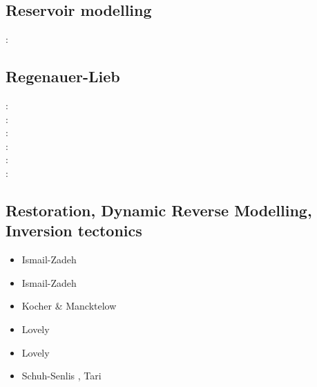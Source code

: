 \begin{scriptsize}
\cite{benz02}
\cite{bewa08}
\cite{urvs08}
\end{scriptsize}

\subsection{Reservoir modelling}

\begin{scriptsize}
\twothousandthirteen: \cite{orwa13}
\end{scriptsize}

\subsection{Regenauer-Lieb}

{\scriptsize
\twothousand: \cite{reyu00}\\
\twothousandthree: \cite{reyu03}\\
\twothousandfour: \cite{reyu04}\\
\twothousandsix: \cite{rehy06}\cite{rewr06}\\
\twothousandnine: \cite{reps09}\\
\twothousandthirteen: \cite{revp13}
}

\subsection{Restoration, Dynamic Reverse Modelling, Inversion tectonics}

\begin{scriptsize}
\begin{itemize}
\item[\twothousandone] Ismail-Zadeh \etal \cite{istv01}
\item[\twothousandfour] Ismail-Zadeh \etal \cite{istt04}
\item[\twothousandfive] Kocher \& Mancktelow \cite{koma05}
\item[\twothousandtwelve] Lovely \etal \cite{lofg12}
\item[\twothousandeighteen] Lovely \etal \cite{lojm18}
\item[\twothousandtwenty] Schuh-Senlis \etal \cite{sctc20}, Tari \etal \cite{taas20}
\end{itemize}
\end{scriptsize}

